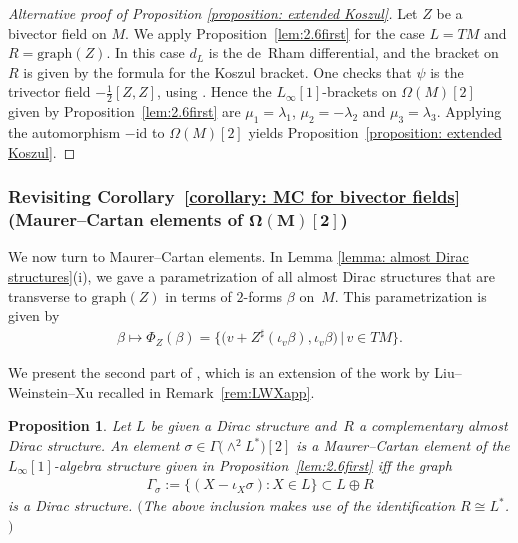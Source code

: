 \documentclass[pdftex]{sigma}
\numberwithin{equation}{section}
\newtheorem{Proposition}[Theorem]{Proposition}
 { \theoremstyle{definition}
\newtheorem{Definition}[Theorem]{Definition}
\newtheorem{Remark}[Theorem]{Remark} }
\begin{document}
\begin{proof}[Alternative proof of Proposition \ref{proposition: extended Koszul}] Let $Z$ be a bivector field on $M$. We apply Proposition~\ref{lem:2.6first} for the case $L=TM$ and $R=\mathrm{graph}(Z)$. In this case $d_L$ is the de~Rham differential, and the bracket on $R$ is given by the formula for the Koszul bracket. One checks that $\psi $ is the trivector field $-\frac{1}{2}[Z,Z]$, using \cite[Lemma~1.6]{SZPre}. Hence the $L_{\infty}[1]$-brackets on $\Omega(M)[2]$ given by Proposition~\ref{lem:2.6first} are $\mu_1 =\lambda_1$, $\mu_2 =-\lambda_2$ and $\mu_3 =\lambda_3$. Applying the automorphism $-\mathrm{id}$ to $\Omega(M)[2]$ yields Proposition~\ref{proposition: extended Koszul}.
\end{proof}

 \subsubsection[Revisiting Corollary \ref{corollary: MC for bivector fields} (Maurer--Cartan elements of {$\Omega(M)[2]$})]{Revisiting Corollary~\ref{corollary: MC for bivector fields} (Maurer--Cartan elements of $\boldsymbol{\Omega(M)[2]}$)}
We now turn to Maurer--Cartan elements. In Lemma \ref{lemma: almost Dirac structures}(i), we gave a parametrization of all almost Dirac structures that are transverse to $\mathrm{graph}(Z)$ in terms of $2$-forms $\beta$ on~$M$. This parametrization is given by
\begin{gather*}\beta \mapsto \Phi_Z(\beta)=\big\{\big(v+Z^\sharp(\iota_v\beta),\iota_v\beta\big) \, | \, v \in TM\big\}.\end{gather*}

We present the second part of \cite[Lemma~2.6]{FZgeo}, {which is} an extension of the work by Liu--Weinstein--Xu recalled in Remark~\ref{rem:LWXapp}.
\begin{Proposition}\label{proposition: MC for bivector fields}Let $L$ be given a Dirac structure and~$R$ a complementary almost Dirac structure. An element $\sigma\in \Gamma\big({\wedge}^2 L^*\big)[2]$ is a Maurer--Cartan element of the $L_{\infty}[1]$-algebra structure given in Proposition~{\rm \ref{lem:2.6first}} iff the graph \begin{gather*}\Gamma_{\sigma}:= \{ (X-\iota_X \sigma)\colon X\in L\}\subset L\oplus R\end{gather*}
 is a Dirac structure. $($The above inclusion makes use of the identification $R\cong L^*$.$)$
\end{Proposition}
\end{document}

